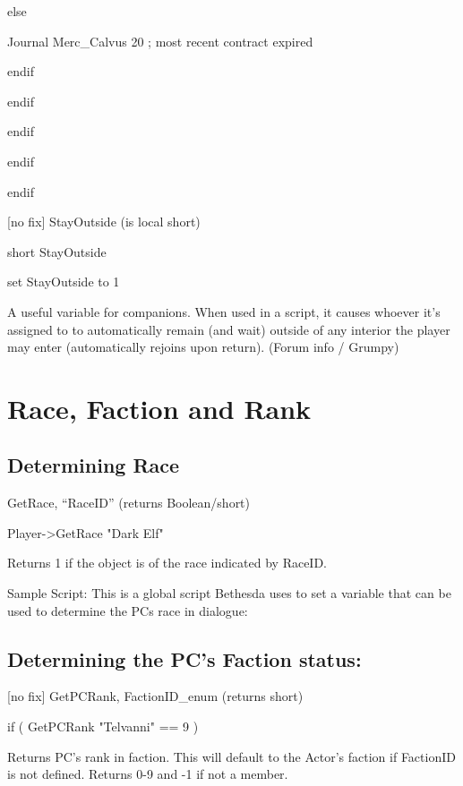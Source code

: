 else

Journal Merc\_Calvus 20 ; most recent contract expired

endif

endif

endif

endif

endif

{[}no fix{]} StayOutside (is local short)

short StayOutside

set StayOutside to 1

A useful variable for companions. When used in a script, it causes
whoever it's assigned to to automatically remain (and wait) outside of
any interior the player may enter (automatically rejoins upon return).
(Forum info / Grumpy)

\hypertarget{race-faction-and-rank}{%
\section{\texorpdfstring{\hfill\break
Race, Faction and
Rank}{ Race, Faction and Rank}}\label{race-faction-and-rank}}

\hypertarget{determining-race}{%
\subsection{Determining Race}\label{determining-race}}

GetRace, ``RaceID'' (returns Boolean/short)

Player-\textgreater GetRace "Dark Elf"

Returns 1 if the object is of the race indicated by RaceID.

Sample Script: This is a global script Bethesda uses to set a variable
that can be used to determine the PCs race in dialogue:



\hypertarget{determining-the-pcs-faction-status}{%
\subsection{Determining the PC's Faction
status:}\label{determining-the-pcs-faction-status}}

{[}no fix{]} GetPCRank, FactionID\_enum (returns short)

if ( GetPCRank "Telvanni" == 9 )

Returns PC's rank in faction. This will default to the Actor's faction
if FactionID is not defined. Returns 0-9 and -1 if not a member.

